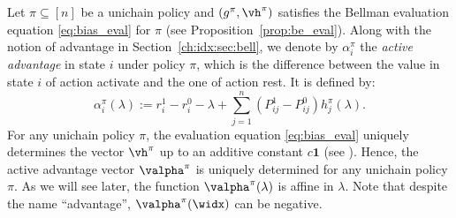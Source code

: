 Let $\pi\subseteq[n]$ be a unichain policy and $(g^\pi, \vh^\pi)$ satisfies the Bellman evaluation equation \eqref{eq:bias_eval} for $\pi$ (see Proposition~\ref{prop:be_eval}).
Along with the notion of advantage in Section~\ref{ch:idx:sec:bell}, we denote by $\alpha^{\pi}_i$ the \emph{active advantage} in state $i$ under policy $\pi$, which is the difference between the value in state $i$ of action activate and the one of action rest.
It is defined by:
\begin{equation}
    \label{eq:advantage}
    \alpha^\pi_i(\lambda):=r^1_i -r^0_i -\lambda +\sum_{j=1}^n (P^1_{ij} -P^0_{ij})h^\pi_j(\lambda).
\end{equation}
For any unichain policy $\pi$, the evaluation equation \eqref{eq:bias_eval} uniquely determines the vector $\vh^\pi$ up to an additive constant $c\mathbf{1}$ (see \cite[Chapter 8]{puterman2014markov}).
Hence, the active advantage vector $\valpha^\pi$ is uniquely determined for any unichain policy $\pi$.
As we will see later, the function $\valpha^\pi(\lambda)$ is affine in $\lambda$.
Note that despite the name ``advantage'', $\valpha^{\pi}(\widx)$ can be negative.

